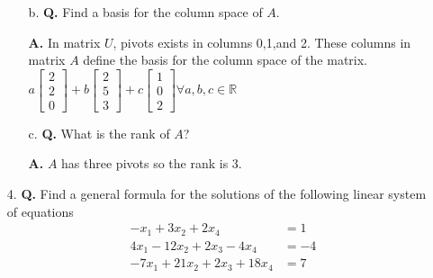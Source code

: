 \documentclass[main.tex]{subfiles}
\begin{document}
\begin{enumerate}
\begin{enumerate}
    \item [b.] \textbf{Q.} Find a basis for the column space of $A$. 
    
    \textbf{A.} In matrix $U$, pivots exists in columns 0,1,and 2. These columns in matrix $A$ define the basis for the column space of the matrix.
    $a\left[\begin{array}{l}2 \\ 2 \\ 0\end{array}\right] + b\left[\begin{array}{l}2 \\ 5 \\ 3\end{array}\right] + c\left[\begin{array}{l}1 \\ 0 \\ 2\end{array}\right] \forall a,b,c \in \mathbb{R}$
    
    
    \item [c.] \textbf{Q.} What is the rank of $A$?
    
    \textbf{A.} $A$ has three pivots so the rank is 3.
    
\end{enumerate}

\item[4.] \textbf{Q.} Find a general formula for the solutions of the following linear system of equations
$$
\begin{aligned}
-x_1 + 3x_2 + 2x_4 & = 1\\
4x_1 - 12x_2 + 2x_3 -4x_4 &= -4\\
-7x_1 +21x_2 + 2x_3 + 18x_4 &= 7
\end{aligned}
$$


\end{enumerate}
\end{document}
